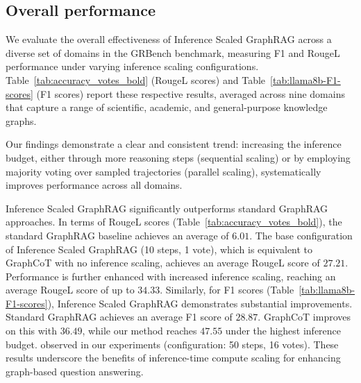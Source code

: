 \subsection{Overall performance}

We evaluate the overall effectiveness of Inference Scaled GraphRAG across a diverse set of domains in the GRBench benchmark, measuring F1 and RougeL performance under varying inference scaling configurations. Table~\ref{tab:accuracy_votes_bold} (RougeL scores) and Table~\ref{tab:llama8b-F1-scores} (F1 scores) report these respective results, averaged across nine domains that capture a range of scientific, academic, and general-purpose knowledge graphs.

Our findings demonstrate a clear and consistent trend: increasing the inference budget, either through more reasoning steps (sequential scaling) or by employing majority voting over sampled trajectories (parallel scaling), systematically improves performance across all domains.

Inference Scaled GraphRAG significantly outperforms standard GraphRAG approaches. In terms of RougeL scores (Table~\ref{tab:accuracy_votes_bold}), the standard GraphRAG baseline achieves an average of $6.01$. The base configuration of Inference Scaled GraphRAG (10 steps, 1 vote), which is equivalent to GraphCoT with no inference scaling, achieves an average RougeL score of $27.21$. Performance is further enhanced with increased inference scaling, reaching an average RougeL score of up to $34.33$. 
Similarly, for F1 scores (Table~\ref{tab:llama8b-F1-scores}), Inference Scaled GraphRAG demonstrates substantial improvements. Standard GraphRAG achieves an average F1 score of $28.87$. GraphCoT improves on this with $36.49$, while our method reaches $47.55$ under the highest inference budget. observed in our experiments (configuration: 50 steps, 16 votes). These results underscore the benefits of inference-time compute scaling for enhancing graph-based question answering.



